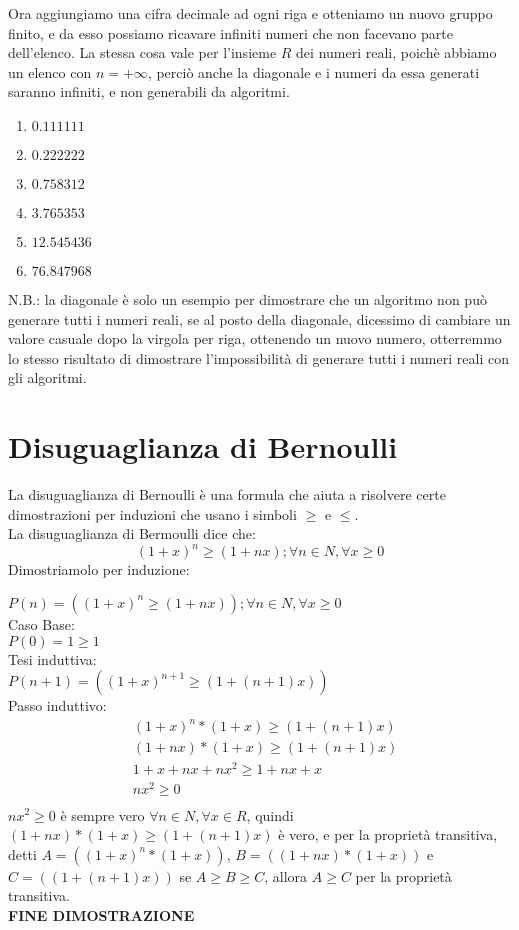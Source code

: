 \documentclass[11pt]{article}
\begin{document}
Ora aggiungiamo una cifra decimale ad ogni riga e otteniamo un nuovo gruppo finito, e da esso 
possiamo ricavare infiniti numeri che non facevano parte dell'elenco. La stessa cosa vale per l'insieme $R$ dei 
numeri reali, poichè abbiamo un elenco con $n = +\infty$, perciò anche la diagonale e i numeri 
da essa generati saranno infiniti, e non generabili da algoritmi.\\
\begin{enumerate}
    \item $0.111111$
    \item $0.222222$
    \item $0.758312$
    \item $3.765353$
    \item $12.545436$
    \item $76.847968$
\end{enumerate}
N.B.: la diagonale è solo un esempio per dimostrare che un algoritmo non può generare tutti i numeri reali, 
se al posto della diagonale, dicessimo di cambiare un valore casuale dopo la virgola per riga, ottenendo un nuovo numero, 
otterremmo lo stesso risultato di dimostrare l'impossibilità di generare tutti i numeri reali con gli algoritmi.
\section{Disuguaglianza di Bernoulli}
La disuguaglianza di Bernoulli è una formula che aiuta a risolvere certe dimostrazioni per induzioni che usano i simboli $\ge$ e $\le$.\\
La disuguaglianza di Bermoulli dice che: $$(1+x)^{n} \ge (1 + nx) ; \forall n \in N, \forall x \ge 0$$ Dimostriamolo per induzione:\\
\begin{center}
    $P(n) = ((1+x)^{n} \ge (1+nx)) ; \forall n \in N, \forall x \ge 0$\\
    Caso Base:\\
    $P(0) = 1 \ge 1$\\
    Tesi induttiva:\\
    $P(n+1) = ((1+x)^{n+1} \ge (1 + (n+1)x))$\\
    Passo induttivo:\\
    \begin{align*}
        &(1+x)^{n}*(1+x) \ge (1 + (n+1)x)\\
        &(1+nx)*(1+x) \ge (1 + (n+1)x)\\
        &1+x+nx+nx^{2} \ge 1 + nx + x\\
        &nx^{2} \ge 0\\
    \end{align*}
    $nx^{2} \ge 0$ è sempre vero $\forall n \in N, \forall x \in R$, quindi $(1+nx)*(1+x) \ge (1 + (n+1)x)$ è vero, e per 
    la proprietà transitiva, detti $A = ((1+x)^{n}*(1+x))$, $B = ((1+nx)*(1+x))$ e $C = ((1 + (n+1)x))$ se $A \ge B \ge C$, allora $A \ge C$
     per la proprietà transitiva.\\
     \textbf{FINE DIMOSTRAZIONE}
\end{center}
\end{document}
